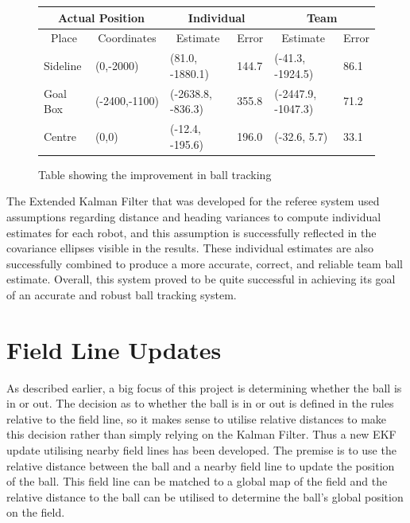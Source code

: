 \documentclass[runningheads,a4paper]{llncs}
\begin{document}
\begin{figure}[H]
\begin{center}
    \begin{tabular}{ | l | l || l | l || l | l | }
    \hline
    \multicolumn{2}{|c||}{Actual Position} & \multicolumn{2}{|c||}{Individual} & \multicolumn{2}{|c|}{Team} \\ \hline
    \multicolumn{1}{|c|}{Place} & \multicolumn{1}{|c||}{Coordinates} & \multicolumn{1}{|c|}{Estimate} & \multicolumn{1}{|c||}{Error} & \multicolumn{1}{|c|}{Estimate} & \multicolumn{1}{|c|}{Error} \\ \hline
    Sideline & (0,-2000) & (81.0, -1880.1) & 144.7	& (-41.3, -1924.5) & 86.1 \\ \hline
    Goal Box & (-2400,-1100) & (-2638.8, -836.3) & 355.8 & (-2447.9, -1047.3) & 71.2 \\ \hline
    Centre & (0,0) & (-12.4, -195.6) & 196.0 & (-32.6, 5.7) & 33.1 \\ \hline
    \end{tabular}
\end{center}
  \caption{Table showing the improvement in ball tracking}
 \label{fig:ballpos}
\end{figure}


The Extended Kalman Filter that was developed for the referee system used assumptions regarding distance and heading variances to compute individual estimates for each robot, and this assumption is successfully reflected in the covariance ellipses visible in the results. These individual estimates are also successfully combined to produce a more accurate, correct, and reliable team ball estimate. Overall, this system proved to be quite successful in achieving its goal of an accurate and robust ball tracking system.


\section{Field Line Updates}

As described earlier, a big focus of this project is determining whether the ball is in or out. The decision as to whether the ball is in or out is defined in the rules relative to the field line, so it makes sense to utilise relative distances to make this decision rather than simply relying on the Kalman Filter. Thus a new EKF update utilising nearby field lines has been developed. The premise is to use the relative distance between the ball and a nearby field line to update the position of the ball. This field line can be matched to a global map of the field and the relative distance to the ball can be utilised to determine the ball's global position on the field. 
\end{document}
